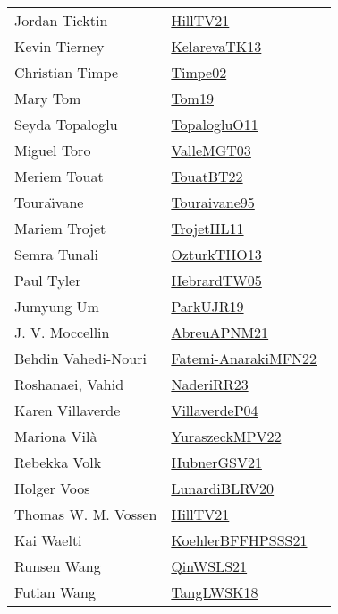 {\begin{longtable}{p{4cm}p{20cm}}
Jordan Ticktin & \href{works/HillTV21.pdf}{HillTV21}~\cite{HillTV21}\\
Kevin Tierney & \href{works/KelarevaTK13.pdf}{KelarevaTK13}~\cite{KelarevaTK13}\\
Christian Timpe & \href{works/Timpe02.pdf}{Timpe02}~\cite{Timpe02}\\
Mary Tom & \href{works/Tom19.pdf}{Tom19}~\cite{Tom19}\\
Seyda Topaloglu & \href{works/TopalogluO11.pdf}{TopalogluO11}~\cite{TopalogluO11}\\
Miguel Toro & \href{works/ValleMGT03.pdf}{ValleMGT03}~\cite{ValleMGT03}\\
Meriem Touat & \href{works/TouatBT22.pdf}{TouatBT22}~\cite{TouatBT22}\\
Toura{\"{\i}}vane & \href{works/Touraivane95.pdf}{Touraivane95}~\cite{Touraivane95}\\
Mariem Trojet & \href{works/TrojetHL11.pdf}{TrojetHL11}~\cite{TrojetHL11}\\
Semra Tunali & \href{works/OzturkTHO13.pdf}{OzturkTHO13}~\cite{OzturkTHO13}\\
Paul Tyler & \href{works/HebrardTW05.pdf}{HebrardTW05}~\cite{HebrardTW05}\\
Jumyung Um & \href{works/ParkUJR19.pdf}{ParkUJR19}~\cite{ParkUJR19}\\
J. V. Moccellin & \href{}{AbreuAPNM21}~\cite{AbreuAPNM21}\\
Behdin Vahedi-Nouri & \href{}{Fatemi-AnarakiMFN22}~\cite{Fatemi-AnarakiMFN22}\\
Roshanaei, Vahid & \href{works/NaderiRR23.pdf}{NaderiRR23}~\cite{NaderiRR23}\\
Karen Villaverde & \href{}{VillaverdeP04}~\cite{VillaverdeP04}\\
Mariona Vil{\`a} & \href{works/YuraszeckMPV22.pdf}{YuraszeckMPV22}~\cite{YuraszeckMPV22}\\
Rebekka Volk & \href{works/HubnerGSV21.pdf}{HubnerGSV21}~\cite{HubnerGSV21}\\
Holger Voos & \href{works/LunardiBLRV20.pdf}{LunardiBLRV20}~\cite{LunardiBLRV20}\\
Thomas W. M. Vossen & \href{works/HillTV21.pdf}{HillTV21}~\cite{HillTV21}\\
Kai Waelti & \href{works/KoehlerBFFHPSSS21.pdf}{KoehlerBFFHPSSS21}~\cite{KoehlerBFFHPSSS21}\\
Runsen Wang & \href{works/QinWSLS21.pdf}{QinWSLS21}~\cite{QinWSLS21}\\
Futian Wang & \href{}{TangLWSK18}~\cite{TangLWSK18}\\

\end{longtable}}
